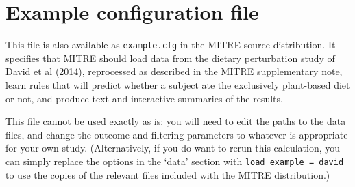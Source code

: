 \documentclass[12pt]{report}
\begin{document}
\chapter{Example configuration file}\label{sample}
This file is also available as \texttt{example.cfg} in the MITRE
source distribution. It specifies that MITRE should load data from the
dietary perturbation study of David et al (2014), reprocessed as
described in the MITRE supplementary note, learn rules that will
predict whether a subject ate the exclusively plant-based diet or not,
and produce text and interactive summaries of the results.

This file cannot be used exactly as is: you will need to edit the
paths to the data files, and change the outcome and filtering
parameters to whatever is appropriate for your own
study. (Alternatively, if you do want to rerun this calculation, you
can simply replace the options in the `data' section with
\texttt{load\_example = david} to use the copies of the relevant files
included with the MITRE distribution.)
\end{document}
